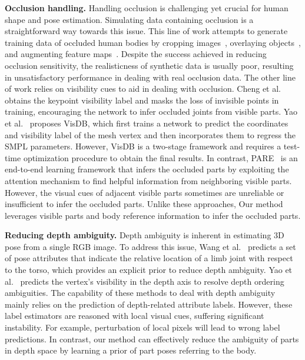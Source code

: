 \documentclass[10pt,twocolumn,letterpaper]{article}
\begin{document}
\textbf{Occlusion handling.}
Handling occlusion is challenging yet crucial for human shape and pose estimation.  Simulating data containing occlusion is a straightforward way towards this issue. This line of work attempts to generate training data of occluded human bodies by cropping images~\cite{biggs20203d,joo2020exemplar,rockwell2020full}, overlaying objects~\cite{georgakis2020hierarchical,sarandi2018robust}, and augmenting feature maps~\cite{cheng20203d}. Despite the success achieved in reducing occlusion sensitivity, the realisticness of synthetic data is usually poor, resulting in unsatisfactory performance in dealing with real occlusion data. The other line of work relies on visibility cues to aid in dealing with occlusion. Cheng et al.~\cite{cheng2019occlusion} obtains the keypoint visibility label and masks the loss of invisible points in training, encouraging the network to infer occluded joints from visible parts. Yao et al.~\cite{yao2022learning} proposes VisDB, which first trains a network to predict the coordinates and visibility label of the mesh vertex and then incorporates them to regress the SMPL parameters. However, VisDB is a two-stage framework and requires a test-time optimization procedure to obtain the final results.  In contrast, PARE~\cite{kocabas2021pare} is an end-to-end learning framework that  infers the occluded parts by exploiting the attention mechanism to find helpful information from neighboring visible parts. However, the visual cues of adjacent visible parts sometimes are unreliable or insufficient to infer the occluded parts.  Unlike these approaches, Our method leverages visible parts and body reference information to infer the occluded parts.










\textbf{Reducing depth ambiguity.}
Depth ambiguity is inherent in estimating 3D pose from a single RGB image. To address this issue, Wang et al.~\cite{wang2019not} predicts a set of pose attributes that indicate the relative location of a limb joint with respect to the torso, which provides an explicit prior to reduce depth ambiguity.  Yao et al.~\cite{yao2022learning} predicts the vertex's visibility in the depth axis to resolve depth ordering ambiguities. The capability of these methods to deal with depth ambiguity mainly relies on the prediction of depth-related attribute labels. However, these label estimators are reasoned with local visual cues, suffering significant instability. For example, perturbation of local pixels will lead to wrong label predictions. In contrast, our method can effectively reduce the ambiguity of parts in depth space by learning a prior of part poses referring to the body.
\end{document}
